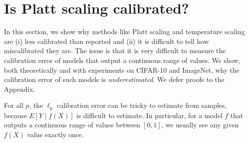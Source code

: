 \section{Is Platt scaling calibrated?}
\label{sec:challenges-measuring}

In this section, we show why methods like Platt scaling and temperature scaling are (i) less calibrated than reported and (ii) it is difficult to tell how miscalibrated they are. The issue is that it is very difficult to measure the calibration error of models that output a continuous range of values. We show, both theoretically and with experiments on CIFAR-10 and ImageNet, why the calibration error of such models is \emph{underestimated}. We defer proofs to the Appendix.





For all $p$, the $\ell_p$ calibration error can be tricky to estimate from samples, because $E[Y \; | \; f(X)]$ is difficult to estimate.
In particular,  for a model $f$ that outputs a continuous range of values between $[0, 1]$, we usually see any given $f(X)$ value exactly once.

